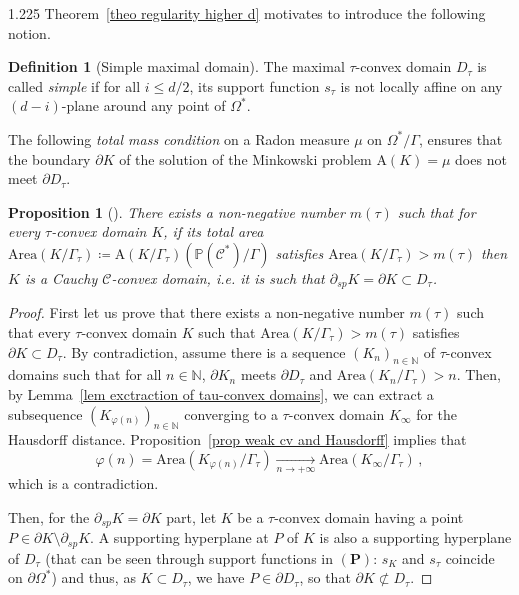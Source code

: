 \documentclass[reqno, a4paper]{amsart}
\numberwithin{equation}{section}
\numberwithin{figure}{section}
\newtheorem{proposition}[theorem]{Proposition}
\theoremstyle{definition}
\newtheorem{definition}[theorem]{Definition}
\theoremstyle{remark}
\newcommand{\N}{\mathbb{N}} %
\renewcommand{\P}{\mathbb{P}} %
\newcommand{\C}{\mathcal{C}} %
\newcommand{\Area}{\mathrm{A}} %
\begin{document}
\begin{spacing}{1.225}
Theorem~\ref{theo regularity higher d} motivates to introduce the following notion. 

\begin{definition}[Simple maximal domain]
\label{def simple}
The maximal $\tau$-convex domain $D_\tau$ is called \emph{simple} if for all $i \leq d/2$, its support function $s_\tau$ is not locally affine on any $(d-i)$-plane around any point of $\Omega^*$. 
\end{definition}

The following \emph{total mass condition} on a Radon measure $\mu$ on $\Omega^*/\Gamma$, ensures that the boundary $\partial K$ of the solution of the Minkowski problem $\Area(K) = \mu$ does not meet $\partial D_\tau$. 

\begin{proposition} [{\cite[Corollary~3.25]{Bonsante_Fillastre_17}}]
\label{prop m(tau)}
There exists a non-negative number $m(\tau)$ such that for every $\tau$-convex domain $K$, if its total area $\mathrm{Area}(K/\Gamma_\tau) \coloneqq \Area(K/\Gamma_\tau)(\P(\C^*)/\Gamma)$ satisfies $\mathrm{Area}(K/\Gamma_\tau)>m(\tau)$ then $K$ is a Cauchy $\C$-convex domain, i.e. it is such that $\partial_{sp} K = \partial K \subset D_\tau$. 
\end{proposition}
\begin{proof}
First let us prove that there exists a non-negative number $m(\tau)$ such that every $\tau$-convex domain $K$ such that $\mathrm{Area}(K/\Gamma_\tau) > m(\tau)$ satisfies $\partial K \subset D_\tau$. By contradiction, assume there is a sequence $(K_n)_{n\in\N}$ of $\tau$-convex domains such that for all $n\in \N$, $\partial K_n$ meets $\partial D_\tau$ and $\mathrm{Area}(K_n/\Gamma_\tau) >n$. Then, by Lemma~\ref{lem exctraction of tau-convex domains}, we can extract a subsequence $(K_{\varphi(n)})_{n\in\N}$ converging to a $\tau$-convex domain $K_\infty$ for the Hausdorff distance. Proposition~\ref{prop weak cv and Hausdorff} implies that 
 \begin{equation*}
 \varphi(n) = \mathrm{Area}(K_{\varphi(n)}/\Gamma_\tau) \xrightarrow[n \to +\infty]{} \mathrm{Area}(K_\infty/\Gamma_\tau) \, ,
 \end{equation*}
 which is a contradiction. 

Then, for the $\partial_{sp} K = \partial K $ part, let $K$ be a $\tau$-convex domain having a point $P \in \partial K \setminus \partial_{sp}K $. A supporting hyperplane at $P$ of $K$ is also a supporting hyperplane of $D_\tau$ (that can be seen through support functions in $(\mathbf{P})$: $s_K$ and $s_\tau$ coincide on $\partial \Omega^*$) and thus, as $K\subset D_\tau$, we have $P \in \partial D_\tau$, so that $\partial K \not\subset D_\tau$. 
\end{proof}


\end{spacing}
\end{document}
